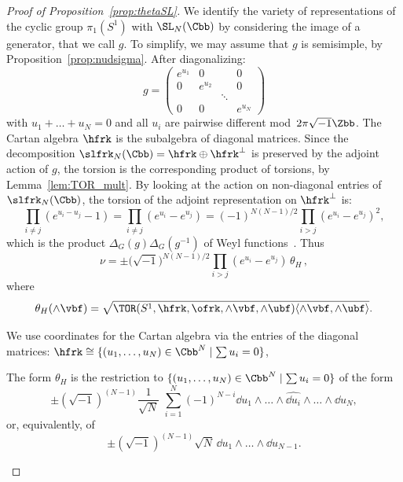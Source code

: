 \begin{proof}[Proof of Proposition~\ref{prop:thetaSL}]
We identify the variety of representations of the cyclic group $ \pi_1(S^1)$ with $\SL_N (\Cbb)$ by considering the image of a generator, that we call $g$. To simplify, we may assume that $g$ is semisimple, by Proposition~\ref{prop:nudsigma}. After diagonalizing:
\[
g=
\begin{pmatrix}
e^{u_1} & 0 & & 0\\
0 & e^{u_2} & & 0 \\
& & \ddots & \\
0&0 & & e^{u_N}
\end{pmatrix}
\]
with $u_1+\dots + u_N=0$ and all $u_i$ are pairwise different mod~$2\pi \sqrt{-1}\Zbb$. The Cartan algebra $\hfrk$ is the subalgebra of diagonal matrices. Since the decomposition $\slfrk_N (\Cbb)=\hfrk\oplus \hfrk^\perp$ is preserved by the adjoint action of $g$, the torsion is the corresponding product of torsions, by Lemma~\ref{lem:TOR_mult}. By looking at the action on non-diagonal entries of $\slfrk_N (\Cbb)$, the torsion of the adjoint representation on $\hfrk^\perp$ is:
\[
\prod_{i\neq j} (e^{u_i-u_j}-1)=\prod_{i\neq j} (e^{u_i}-e^{u_j})=(-1)^{N(N-1)/2} \prod_{i> j}(e^{u_i}-e^{u_j})^2,
\]
which is the product $\Delta_G(g)\Delta_G(g^{-1})$ of Weyl functions~\cite[Section~7]{GoodWall}. Thus
\begin{equation}\label{eqn:thetaOmega}
\nu=\pm \big(\sqrt{-1}\big)^{N(N-1)/2} \prod_{i> j}(e^{u_i}-e^{u_j}) \, \theta_H\,,
\end{equation}
where
\begin{equation}\label{eqn:Omega}
\theta_H(\wedge\vbf)= \sqrt{\TOR(S^1,\hfrk,\ofrk,\wedge\vbf,\wedge\ubf)
\langle \wedge\vbf,\wedge\ubf\rangle }.
\end{equation}



We use coordinates for the Cartan algebra via the entries of the diagonal matrices: $\hfrk\cong \{(u_1,\dots,u_N)\in \Cbb^N\mid \sum u_i=0 \} $,



\begin{lemm}\label{lemmma:wedgewithdui}
The form $\theta_H$ is the restriction to $\{(u_1,\dots,u_N)\in \Cbb^N\mid \sum u_i=0 \} $ of the form
\[
\pm \left(\sqrt{-1} \right)^{(N-1)} \frac{1}{\sqrt N} \, \, \sum_{i=1}^N (-1)^{N-i}\dd u_1\wedge\dots\wedge \widehat{\dd u_i}\wedge \dots \wedge \dd u_N,
\]
or, equivalently, of
\[
\pm \left(\sqrt{-1} \right)^{(N-1)} \sqrt N \, \dd u_1\wedge\dots\wedge \dd u_{N-1}.
\]
\end{lemm}


\end{proof}
